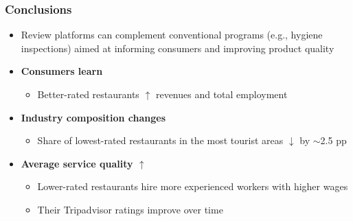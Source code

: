 \documentclass[aspectratio=169]{beamer}
\begin{document}
\begin{frame}[label=conclusions]
\frametitle{Conclusions}
\begin{itemize}

\item<1-> Review platforms can complement conventional programs (e.g., hygiene inspections) aimed at informing consumers and improving product quality  
\vspace{3.5mm}

\item<2->[\textbf{1.}] \textbf{Consumers learn}
 \begin{itemize}
\item Better-rated restaurants $\uparrow$ revenues and total employment
\end{itemize}


\vspace{3mm}

 \item<2->[\textbf{2.}]   \textbf{Industry composition changes}
 \begin{itemize}
\item Share of lowest-rated restaurants in the most tourist areas $\downarrow$ by $\sim$2.5 pp
\end{itemize}


\vspace{3mm}

\item<2->[\textbf{3.}]  \textbf{Average service quality $\uparrow$}

\begin{itemize}
\item Lower-rated restaurants hire more experienced workers with higher wages
\vspace{0.5mm}
\item Their Tripadvisor ratings improve over time
\end{itemize}

\end{itemize}

\end{frame}

\end{document}
